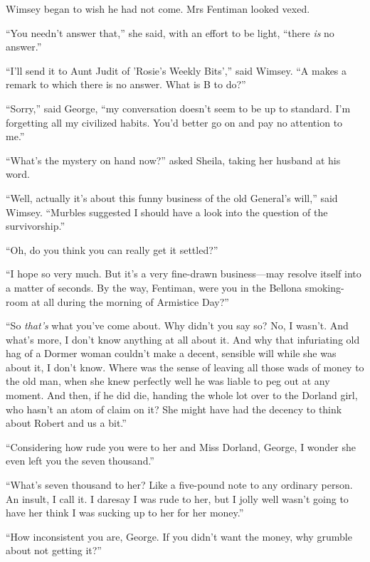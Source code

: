 Wimsey began to wish he had not come. Mrs Fentiman looked vexed.

\enquote{You needn't answer that,} she said, with an effort to be light, \enquote{there \textit{is} no answer.}

\enquote{I'll send it to Aunt Judit of 'Rosie's Weekly Bits',} said Wimsey. \enquote{A makes a remark to which there is no answer. What is B to do?}

\enquote{Sorry,} said George, \enquote{my conversation doesn't seem to be up to standard. I'm forgetting all my civilized habits. You'd better go on and pay no attention to me.}

\enquote{What's the mystery on hand now?} asked Sheila, taking her husband at his word.

\enquote{Well, actually it's about this funny business of the old General's will,} said Wimsey. \enquote{Murbles suggested I should have a look into the question of the survivorship.}

\enquote{Oh, do you think you can really get it settled?}

\enquote{I hope so very much. But it's a very fine-drawn business\allowbreak---\allowbreak may resolve itself into a matter of seconds. By the way, Fentiman, were you in the Bellona smoking-room at all during the morning of Armistice Day?}

\enquote{So \textit{that's} what you've come about. Why didn't you say so? No, I wasn't. And what's more, I don't know anything at all about it. And why that infuriating old hag of a Dormer woman couldn't make a decent, sensible will while she was about it, I don't know. Where was the sense of leaving all those wads of money to the old man, when she knew perfectly well he was liable to peg out at any moment. And then, if he did die, handing the whole lot over to the Dorland girl, who hasn't an atom of claim on it? She might have had the decency to think about Robert and us a bit.}

\enquote{Considering how rude you were to her and Miss Dorland, George, I wonder she even left you the seven thousand.}

\enquote{What's seven thousand to her? Like a five-pound note to any ordinary person. An insult, I call it. I daresay I was rude to her, but I jolly well wasn't going to have her think I was sucking up to her for her money.}

\enquote{How inconsistent you are, George. If you didn't want the money, why grumble about not getting it?}


